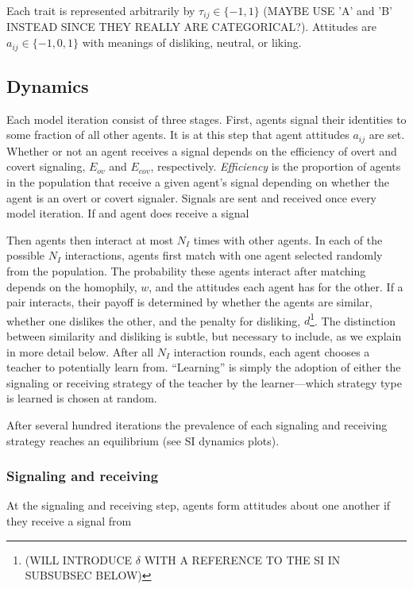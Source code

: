 \documentclass[11pt,letterpaper]{article}
\begin{document}
Each trait is represented arbitrarily by $\tau_{ij} \in \{-1, 1\}$ 
(MAYBE USE 'A' and 'B' INSTEAD SINCE THEY REALLY ARE CATEGORICAL?). 
Attitudes are $a_{ij} \in \{-1, 0, 1\}$ with meanings of 
disliking, neutral, or liking. 

\subsection{Dynamics}

Each model iteration consist of three stages. First, agents signal their identities
to some fraction of all other agents. It is at this step that agent attitudes
$a_{ij}$ are set. Whether or not an agent receives a signal depends on the
efficiency of overt and covert signaling, $E_{ov}$ and $E_{cov}$, respectively.
\emph{Efficiency} is the proportion of agents in the population that receive
a given agent's signal depending on whether the agent is an overt or covert
signaler.  Signals are sent and received once every model iteration. 
If and agent does receive a signal

Then agents then
interact at most $N_I$ times with other agents. In each of the possible 
$N_I$ interactions, agents first match with one agent selected randomly from
the population. The probability these agents interact after matching depends
on the homophily, $w$, and the attitudes each agent has for the other. 
If a pair interacts, their payoff is determined by whether the agents are
similar, whether one dislikes the other, and the penalty for disliking,
$d$\footnote{(WILL INTRODUCE $\delta$ WITH A REFERENCE TO THE SI IN SUBSUBSEC
BELOW)}. The distinction between similarity and disliking is subtle, 
but necessary to include, as we explain in more detail below. After all
$N_I$ interaction rounds, each agent chooses a teacher to potentially learn
from. ``Learning'' is simply the adoption of either the signaling or
receiving strategy of the teacher by the learner---which strategy type is 
learned is chosen at random. 

After several hundred iterations the prevalence of each signaling and
receiving strategy reaches an equilibrium (see SI dynamics plots). 


\subsubsection{Signaling and receiving}

At the signaling and receiving step, agents form attitudes about one another if
they receive a signal from 
\end{document}
